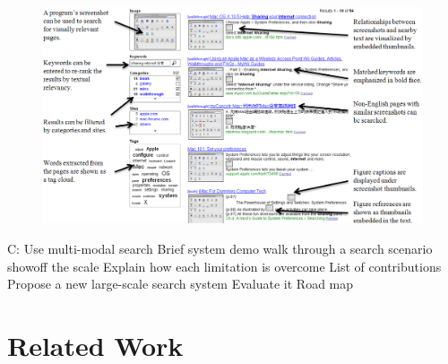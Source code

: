 \documentclass{www2010-submission}
\begin{document}
\begin{figure}
\includegraphics[width=2\columnwidth]{figure/main_result.png}
\end{figure}

%

C: Use multi-modal search
    Brief system demo
        walk through a search scenario
        showoff the scale
    Explain how each limitation is overcome
    List of contributions
        Propose a new large-scale search system
        Evaluate it
    Road map

\section{Related Work}
\end{document}
